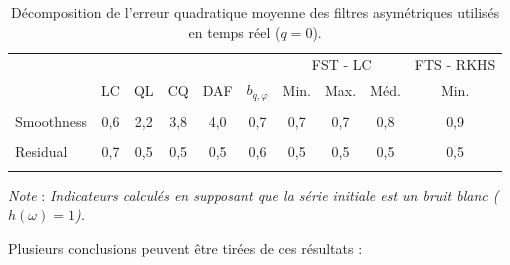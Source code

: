 \documentclass[
  11pt,
  french,
  a4paper]{article}
\newcommand\1{\mathds{1}}
\begin{document}
\begin{table}[!h]

\caption{\label{tab:tab-mse-q0}Décomposition de l'erreur quadratique moyenne des filtres asymétriques utilisés en temps réel ($q=0$).}
\centering
\begin{tabular}[t]{lccccccccc}
\toprule
\multicolumn{6}{c}{ } & \multicolumn{3}{c}{FST - LC} & \multicolumn{1}{c}{FTS - RKHS} \\
\cmidrule(l{3pt}r{3pt}){7-9} \cmidrule(l{3pt}r{3pt}){10-10}
  & LC & QL & CQ & DAF & $b_{q,\varphi}$ & Min. & Max. & Méd. & Min.\\
\midrule
\cellcolor{gray!6}{Accuracy} & \cellcolor{gray!6}{0,4} & \cellcolor{gray!6}{0,4} & \cellcolor{gray!6}{0,4} & \cellcolor{gray!6}{0,4} & \cellcolor{gray!6}{0,4} & \cellcolor{gray!6}{0,4} & \cellcolor{gray!6}{0,5} & \cellcolor{gray!6}{0,4} & \cellcolor{gray!6}{0,4}\\
Smoothness & 0,6 & 2,2 & 3,8 & 4,0 & 0,7 & 0,7 & 0,7 & 0,8 & 0,9\\
\cellcolor{gray!6}{Timeliness} & \cellcolor{gray!6}{0,5} & \cellcolor{gray!6}{0,6} & \cellcolor{gray!6}{0,6} & \cellcolor{gray!6}{0,6} & \cellcolor{gray!6}{0,5} & \cellcolor{gray!6}{0,5} & \cellcolor{gray!6}{0,5} & \cellcolor{gray!6}{0,5} & \cellcolor{gray!6}{0,5}\\
Residual & 0,7 & 0,5 & 0,5 & 0,5 & 0,6 & 0,5 & 0,5 & 0,5 & 0,5\\
\cellcolor{gray!6}{RMSE} & \cellcolor{gray!6}{2,2} & \cellcolor{gray!6}{3,7} & \cellcolor{gray!6}{5,2} & \cellcolor{gray!6}{5,5} & \cellcolor{gray!6}{2,2} & \cellcolor{gray!6}{2,2} & \cellcolor{gray!6}{2,1} & \cellcolor{gray!6}{2,2} & \cellcolor{gray!6}{2,3}\\
\bottomrule
\end{tabular}
\footnotesize


\emph{Note} : \emph{Indicateurs calculés en supposant que la série initiale est un bruit blanc (\(h(\omega)=1\)).}
\normalsize\end{table}

Plusieurs conclusions peuvent être tirées de ces résultats :
\end{document}

